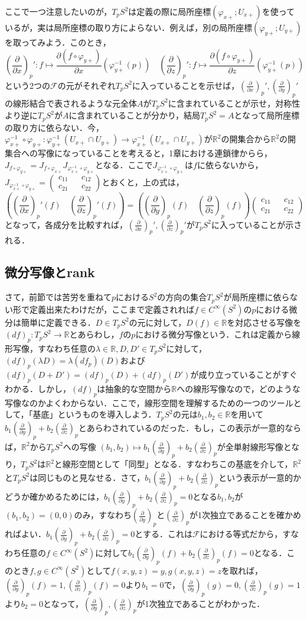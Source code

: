 \documentclass{jsarticle}
\def\vecb{\begin{pmatrix}}
\def\vece{\end{pmatrix}}
\def\realnum{{\mathbb R}}
\def\dfrac{\displaystyle\frac}
\def\delxp{\left(\dfrac{\partial}{\partial x}\right)_p}
\def\delyp{\left(\dfrac{\partial}{\partial y}\right)_p}
\def\delzp{\left(\dfrac{\partial}{\partial z}\right)_p}
\begin{document}
ここで一つ注意したいのが，$T_pS^2$は定義の際に局所座標$(\varphi_{x+};U_{x+})$を使っているが，実は局所座標の取り方によらない．例えば，別の局所座標$(\varphi_{y+};U_{y+})$を取ってみよう．このとき，
$$
\delxp':f\mapsto \dfrac{\partial (f\circ\varphi_{y+})}{\partial x}(\varphi_{y+}^{-1}(p))\quad
\delzp':f\mapsto \dfrac{\partial (f\circ\varphi_{y+})}{\partial z}(\varphi_{y+}^{-1}(p))
$$
という2つの$\mathcal F$の元がそれぞれ$T_pS^2$に入っていることを示せば，$\delxp',\delyp'$の線形結合で表されるような元全体$A$が$T_pS^2$に含まれていることが示せ，対称性より逆に$T_pS^2$が$A$に含まれていることが分かり，結局$T_pS^2=A$となって局所座標の取り方に依らない．今，$\varphi_{x+}^{-1}\circ\varphi_{y+}:\varphi_{y+}^{-1}(U_{x+}\cap U_{y+})\rightarrow\varphi_{x+}^{-1}(U_{x+}\cap U_{y+})$が$\realnum^2$の開集合から$\realnum^2$の開集合への写像になっていることを考えると，1章における連鎖律からら，$J_{f\circ\varphi_{y+}}=J_{f\circ\varphi_{x+}}J_{\varphi_{x+}^{-1}\circ\varphi_{y+}}$となる．ここで$J_{\varphi_{x+}^{-1}\circ\varphi_{y+}}$は$f$に依らないから，$J_{\varphi_{x+}^{-1}\circ\varphi_{y+}}=\vecb c_{11} && c_{12} \\ c_{21} && c_{22}\vece$とおくと，上の式は，
$$
\left(\delxp'(f)\quad\delzp'(f)\right)=\left(\delyp(f)\quad\delzp(f)\right)\vecb c_{11} && c_{12} \\ c_{21} && c_{22}\vece
$$
となって，各成分を比較すれば，$\delxp',\delzp'$が$T_pS^2$に入っていることが示される．


\subsection{微分写像とrank}
さて，前節では苦労を重ねて$p$における$S^2$の方向の集合$T_pS^2$が局所座標に依らない形で定義出来たわけだが，ここまで定義されれば$f\in C^{\infty}(S^2)$の$p$における微分は簡単に定義できる．$D\in T_pS^2$の元に対して，$D(f)\in \realnum$を対応させる写像を$(df)_p:T_pS^2\rightarrow \realnum$とあらわし，$f$の$p$における微分写像という．これは定義から線形写像，すなわち任意の$\lambda\in\realnum, D,D'\in T_pS^2$に対して，$(df)_p(\lambda D)=\lambda (df_p)(D)$および$(df)_p(D+D')=(df)_p(D)+(df)_p(D')$が成り立っていることがすぐわかる．しかし，$(df)_p$は抽象的な空間から$\realnum$への線形写像なので，どのような写像なのかよくわからない．ここで，線形空間を理解するための一つのツールとして，「基底」というものを導入しよう．$T_pS^2$の元は$b_1,b_2\in\realnum$を用いて$b_1\delyp+b_2\delzp$とあらわされているのだった．もし，この表示が一意的ならば，$\realnum^2$から$T_pS^2$への写像
$(b_1,b_2)\mapsto b_1\delyp+b_2\delzp$が全単射線形写像となり，$T_pS^2$は$\realnum^2$と線形空間として「同型」となる．すなわちこの基底を介して，$\realnum^2$と$T_pS^2$は同じものと見なせる．さて，$b_1\delyp+b_2\delzp$という表示が一意的かどうか確かめるためには，$b_1\delyp+b_2\delzp=0$となる$b_1,b_2$が$(b_1,b_2)=(0,0)$のみ，すなわち$\delyp$と$\delzp$が1次独立であることを確かめればよい．$b_1\delyp+b_2\delzp=0$とする．これは$\mathcal F$における等式だから，すなわち任意の$f\in C^{\infty}(S^2)$に対して$b_1\delyp(f)+b_2\delzp(f)=0$となる．このとき$f,g\in C^{\infty}(S^2)$として$f(x,y,z)=y,g(x,y,z)=z$を取れば，$\delyp(f)=1,\delzp(f)=0$より$b_1=0$で，$\delyp(g)=0,\delzp(g)=1$より$b_2=0$となって，$\delyp,\delzp$が1次独立であることがわかった．
\end{document}
